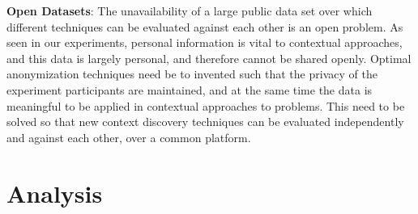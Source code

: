 \textbf{\textbf{Open Datasets}}: The unavailability of a large public data set over which different techniques can be evaluated against each other is an open problem. As seen in our experiments, personal information is vital to contextual approaches, and this data is largely personal, and therefore cannot be shared openly. Optimal anonymization techniques need be to invented such that the privacy of the experiment participants are maintained, and at the same time the data is meaningful to be applied in contextual approaches to problems. This need to be solved so that new context discovery techniques can be evaluated independently and against each other, over a common platform.

\section{Analysis}
%

